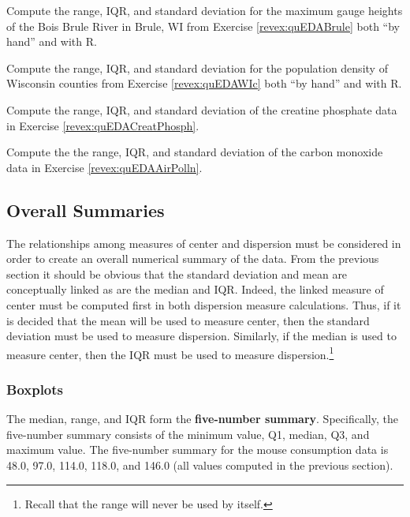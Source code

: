 \documentclass[10pt,openany]{book}\usepackage[]{graphicx}\usepackage[]{color}
\begin{document}
\begin{exsection}
  \item \label{revex:quEDABruleDisp} \rhw{} Compute the range, IQR, and standard deviation for the maximum gauge heights of the Bois Brule River in Brule, WI from Exercise \ref{revex:quEDABrule} both ``by hand'' and with R. 

  \item \label{revex:quEDAWIDisp} \rhw{} Compute the range, IQR, and standard deviation for the population density of Wisconsin counties from Exercise \ref{revex:quEDAWIc} both ``by hand'' and with R. 

  \item \label{revex:quEDACreatPhosph3} \rhw{} Compute the range, IQR, and standard deviation of the creatine phosphate data in Exercise \ref{revex:quEDACreatPhosph}. 

  \item \label{revex:quEDAAirPolln3} \rhw{} \hspace{12pt} Compute the the range, IQR, and standard deviation of the carbon monoxide data in Exercise \ref{revex:quEDAAirPolln}. 
\end{exsection}


\subsection{Overall Summaries}
The relationships among measures of center and dispersion must be considered in order to create an overall numerical summary of the data.  From the previous section it should be obvious that the standard deviation and mean are conceptually linked as are the median and IQR.  Indeed, the linked measure of center must be computed first in both dispersion measure calculations.  Thus, if it is decided that the mean will be used to measure center, then the standard deviation must be used to measure dispersion.  Similarly, if the median is used to measure center, then the IQR must be used to measure dispersion.\footnote{Recall that the range will never be used by itself.}


\subsubsection{Boxplots}
The median, range, and IQR form the \textbf{five-number summary}.  Specifically, the five-number summary consists of the minimum value, Q1, median, Q3, and maximum value.  The five-number summary for the mouse consumption data is 48.0, 97.0, 114.0, 118.0, and 146.0 (all values computed in the previous section).
\end{document}
